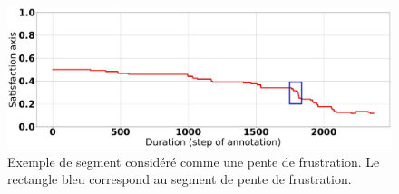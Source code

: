 \begin{figure}[h]
  \centering
  \includegraphics[width=15cm]{./Chapitre7/figures/pic.jpeg}
  \caption{Exemple de segment considéré comme une pente de frustration. Le rectangle bleu correspond au segment de pente de frustration.}
  \label{fig:pente}
\end{figure}
